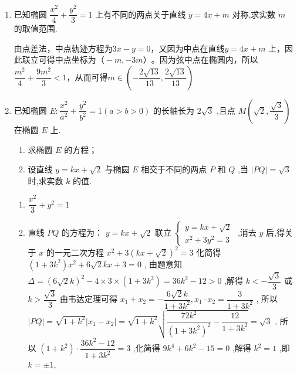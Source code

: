 \begin{enumerate}
 \item 已知椭圆 $\dfrac{{x}^{2}}{4} + \dfrac{{y}^{2}}{3} = 1$ 上有不同的两点关于直线 $y = {4x} + m$ 对称,求实数 $m$ 的取值范围.
 \begin{jieda}
     由点差法，中点轨迹方程为$3x-y=0$，又因为中点在直线$y = {4x} + m$ 上，因此联立可得中点坐标为$（-m,-3m）$。因为弦中点在椭圆内，所以$\dfrac{m^2}{4}+\dfrac{9m^2}{3}<1$，从而可得$m\in(-\dfrac{2\sqrt{13}}{13},\dfrac{2\sqrt{13}}{13})$
 \end{jieda}

 \item 已知椭圆 $E : \dfrac{{x}^{2}}{{a}^{2}} + \dfrac{{y}^{2}}{{b}^{2}} = 1\left( {a > b > 0}\right)$ 的长轴长为 $2\sqrt{3}$ ,且点 $M\left( {\sqrt{2},\dfrac{\sqrt{3}}{3}}\right)$ 在椭圆 $E$ 上.
\begin{enumerate}
    \item 求椭圆 $E$ 的方程；
    \item 设直线 $y = {kx} + \sqrt{2}$ 与椭圆 $E$ 相交于不同的两点 $P$ 和 $Q$ ,当 $\left| {PQ}\right|  = \sqrt{3}$ 时,求实数 $k$ 的值.
\end{enumerate}

\begin{jieda}
    \begin{enumerate}
        \item $\dfrac{x^2}{3}+y^2=1$
        \item 直线 $ {PQ} $ 的方程为： $ y = {kx} + \sqrt{2} $
联立 $ \left\{  \begin{array}{l} y = {kx} + \sqrt{2} \\  {x}^{2} + 3{y}^{2} = 3 \end{array}\right. $ ,消去 $ y $ 后,得关于 $ x $ 的一元二次方程
$ {x}^{2} + 3{\left( kx + \sqrt{2}\right) }^{2} = 3 $
化简得 $ \left( {1 + 3{k}^{2}}\right) {x}^{2} + 6\sqrt{2}{kx} + 3 = 0 $ ,
由题意知 $ \Delta  = {\left( 6\sqrt{2}k\right) }^{2} - 4 \times  3 \times  \left( {1 + 3{k}^{2}}\right)  = {36}{k}^{2} - {12} > 0 $ ,解得 $ k <  - \dfrac{\sqrt{3}}{3} $ 或
$ k > \dfrac{\sqrt{3}}{3} $
由韦达定理可得 $ {x}_{1} + {x}_{2} =  - \dfrac{6\sqrt{2}k}{1 + 3{k}^{2}},{x}_{1} \cdot  {x}_{2} = \dfrac{3}{1 + 3{k}^{2}} $ ,
所以 $ \left| {PQ}\right|  = \sqrt{1 + {k}^{2}}\left| {{x}_{1} - {x}_{2}}\right|  = \sqrt{1 + {k}^{2}}\sqrt{\dfrac{{72}{k}^{2}}{{\left( 1 + 3{k}^{2}\right) }^{2}} - \dfrac{12}{1 + 3{k}^{2}}} = \sqrt{3} $ ,
所以 $ \left( {1 + {k}^{2}}\right)  \cdot  \dfrac{{36}{k}^{2} - {12}}{1 + 3{k}^{2}} = 3 $ ,化简得 $ 9{k}^{4} + 6{k}^{2} - {15} = 0 $ ,解得 $ {k}^{2} = 1 $ ,即
$ k =  \pm  1, $
    \end{enumerate}
\end{jieda}
\end{enumerate}

